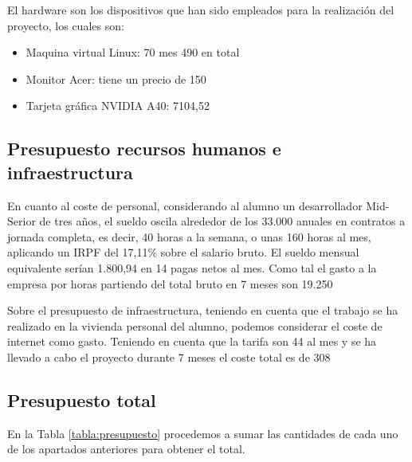 El hardware son los dispositivos que han sido empleados para la realización del proyecto, los cuales son:

\begin{itemize}
    \item Maquina virtual Linux: 70\EUR{} mes 490\EUR{} en total 
    \item Monitor Acer: tiene un precio de 150\EUR{}
    \item Tarjeta gráfica NVIDIA A40: 7104,52\EUR{}
\end{itemize}


\subsection{Presupuesto recursos humanos e infraestructura}
En cuanto al coste de personal, considerando al alumno un desarrollador Mid-Serior de tres años, el sueldo oscila alrededor de los 33.000\EUR{} anuales en contratos a jornada completa, es decir, 40 horas a la semana, o unas 160 horas al mes, aplicando un IRPF del 17,11\% sobre el salario bruto. El sueldo mensual equivalente serían 1.800,94\EUR{} en 14 pagas netos al mes. Como tal el gasto a la empresa por horas  partiendo del total bruto en 7 meses son 19.250\EUR{}

Sobre el presupuesto de infraestructura, teniendo en cuenta que el trabajo se ha realizado en la vivienda personal del alumno, podemos considerar el coste de internet como gasto. Teniendo en cuenta que la tarifa son 44\EUR{} al mes y se ha llevado a cabo el proyecto durante 7 meses el coste total es de 308\EUR{}

\subsection{Presupuesto total}
En la Tabla \ref{tabla:presupuesto} procedemos a sumar las cantidades de cada uno de los apartados anteriores para obtener el total.

